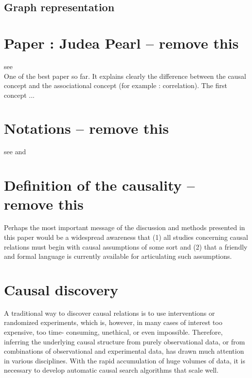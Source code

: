 \documentclass{article}
\begin{document}
\cite{pearl2019seven} 
 
 
 \subsection{Graph representation}


\newpage 

\section{Paper : Judea Pearl -- remove this}

see \cite{pearl2010mathematics} \\
One of the best paper so far. It explains clearly the difference between the causal concept and the associational concept (for example : correlation). The first concept ...




\section{Notations -- remove this}
see \cite{yao2020survey} and \cite{hernan2020causal}



\section{Definition of the causality -- remove this}

Perhaps the most important message of the discussion and methods presented in this paper would be a widespread awareness that (1) all studies concerning causal relations must begin with causal assumptions of some sort and (2) that a friendly and formal language is currently available for articulating such assumptions.\cite{pearl2010mathematics}

\cite{rubin2005causal}


\newpage

\section{Causal discovery}

A traditional way to discover causal relations is to use interventions or randomized experiments, which is, however, in many cases of interest too expensive, too time- consuming, unethical, or even impossible. Therefore, inferring the underlying causal structure from purely observational data, or from combinations of observational and experimental data, has drawn much attention in various disciplines. With the rapid accumulation of huge volumes of data, it is necessary to develop automatic causal search algorithms that scale well.\cite{10.3389/fgene.2019.00524}
\end{document}
